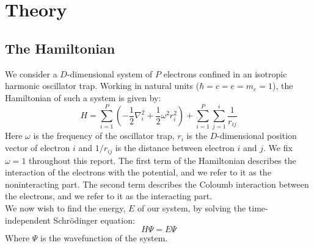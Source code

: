 \documentclass[a4paper, 10pt]{article}
\begin{document}
	\section{Theory}\label{sec:Theory}
	\subsection{The Hamiltonian}
	We consider a $D$-dimensional system of $P$ electrons confined in an isotropic harmonic oscillator trap. Working in natural units ($\hbar=c=e=m_e=1$), the Hamiltonian of such a system is given by:
	\begin{equation}\label{eq:Hamiltonian}
	H=\sum_{i=1}^P \left(-\frac{1}{2}\nabla_i^2 +\frac{1}{2}\omega^2 r_i^2\right)+\sum_{i=1}^P \sum_{j=1}^{i}\frac{1}{r_{ij}}
	\end{equation}
	Here $\omega$ is the frequency of the oscillator trap, $r_{i}$ is the $D$-dimensional position vector of electron $i$ and $1/r_{ij}$ is the distance between electron $i$ and $j$. We fix $\omega=1$ throughout this report. The first term of the Hamiltonian describes the interaction of the electrons with the potential, and we refer to it as the noninteracting part. The second term describes the Coloumb interaction between the electrons, and we refer to it as the interacting part.\\
	\linebreak
	We now wish to find the energy, $E$ of our system, by solving the time-independent Schrödinger equation:
	\begin{equation}\label{eq:time_depenedent_schrodinger}
	H\Psi = E\Psi
	\end{equation}
	Where $\Psi$ is the wavefunction of the system.
\end{document}

